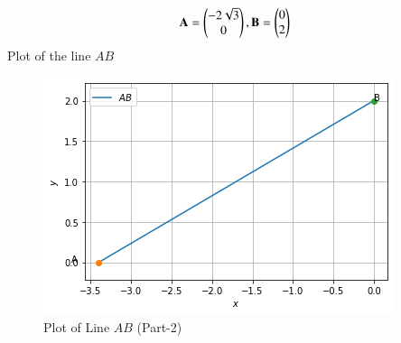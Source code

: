 \documentclass[journal,12pt,twocolumn]{IEEEtran}
\begin{document}
\begin{align}
\mathbf{A} = \begin{pmatrix}-2\sqrt{3}\\0\end{pmatrix},\mathbf{B} = \begin{pmatrix}0\\2\end{pmatrix}   
\end{align}
Plot of the line $AB$ 
\begin{figure}[ht]
\centering
\includegraphics[width=\columnwidth]{Line_Plot_Part-2.PNG}
\caption{Plot of Line $AB$ (Part-2)}
\label{Plot of Line $AB$ (Part-2)}
\end{figure}
\end{document}

